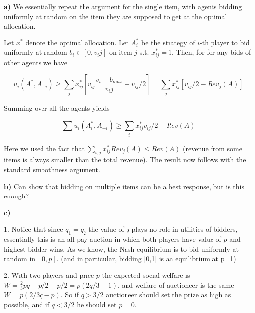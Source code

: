 \textbf{a)} We essentially repeat the argument for the single item, with agents bidding uniformly at random on the item they are supposed to get at the optimal allocation.

Let $x^*$ denote the optimal allocation. Let $A_i^*$ be the strategy of $i$-th player to bid uniformly at random $b_i\in[0,v_ij]$ on item $j$ s.t. $x_{ij}^*=1$. Then, for for any bids of other agents we have

$$
u_i(A^*,A_{-i}) \geq \sum_j x_{ij}^*[v_{ij} \frac{v_i-b_{max}}{v_ij} - v_{ij}/2]= \sum_j x_{ij}^*[v_{ij}/2-Rev_j(A)]
$$

Summing over all the agents yields

$$
\sum u_i(A_i^*,A_{-i}) \geq \sum_i x_{ij}^* v_{ij}/2 - Rev(A)
$$

Here we used the fact that $\sum_{i,j} x_{ij}^*Rev_j(A)\leq Rev(A)$ (revenue from some items is always smaller than the total revenue). The result now follows with the standard smoothness argument.

\textbf{b)} Can show that bidding on multiple items can be a best response, but is this enough?

\textbf{c)}

1. Notice that since $q_1=q_2$ the value of $q$ plays no role in utilities of bidders, essentially this is an all-pay auction in which both players have value of $p$ and highest bidder wins. As we know, the Nash equilibrium is to bid uniformly at random in $[0,p]$. (and in particular, bidding [0,1] is an equilibrium at p=1)

2. With two players and price $p$ the expected social welfare is $W=\frac{2}{3}pq-p/2-p/2=p(2q/3-1)$, and  welfare of auctioneer is the same $W=p(2/3q-p)$. So if $q>3/2$ auctioneer should set the prize as high as possible, and if $q<3/2$ he should set $p=0$. 